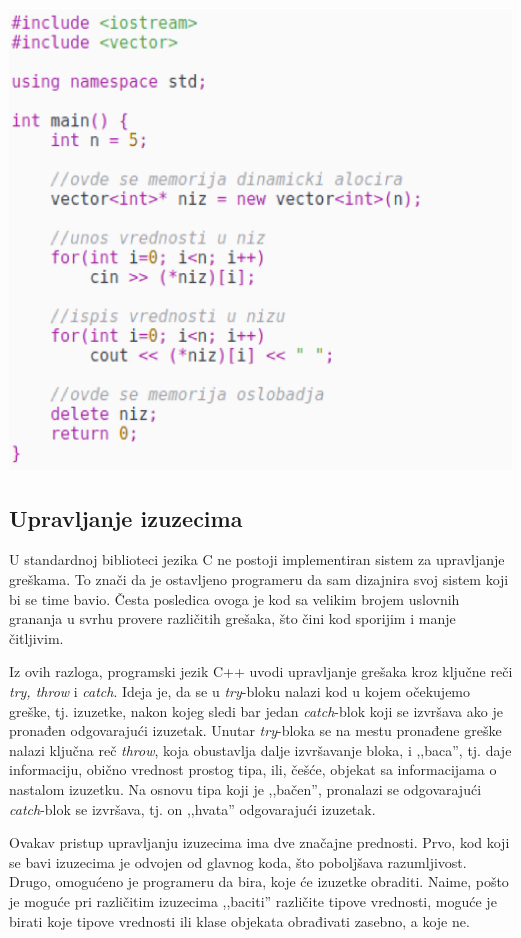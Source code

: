 \documentclass[a4paper]{article}
\begin{document}
{\includegraphics[scale=0.5]{cpp_kod_dinamicka_alokacija.eps}

\subsection{Upravljanje izuzecima}

U standardnoj biblioteci jezika C ne postoji implementiran sistem za upravljanje greškama. To znači da je ostavljeno programeru da sam dizajnira svoj sistem koji bi se time bavio. Česta posledica ovoga je kod sa velikim brojem uslovnih grananja u svrhu provere različitih grešaka, što čini kod sporijim i manje čitljivim.

Iz ovih razloga, programski jezik C++ uvodi upravljanje grešaka kroz ključne reči \emph{try, throw} i \emph{catch}. Ideja je, da se u \emph{try}-bloku nalazi kod u kojem očekujemo greške, tj. izuzetke, nakon kojeg sledi bar jedan \emph{catch}-blok koji se izvršava ako je pronađen odgovarajući izuzetak. Unutar \emph{try}-bloka se na mestu pronađene greške nalazi ključna reč \emph{throw}, koja obustavlja dalje izvršavanje bloka, i ,,baca'', tj. daje informaciju, obično vrednost prostog tipa, ili, češće, objekat sa informacijama o nastalom izuzetku. Na osnovu tipa koji je ,,bačen'', pronalazi se odgovarajući \emph{catch}-blok se izvršava, tj. on ,,hvata'' odgovarajući izuzetak.

Ovakav pristup upravljanju izuzecima ima dve značajne prednosti. Prvo, kod koji se bavi izuzecima je odvojen od glavnog koda, što poboljšava razumljivost. Drugo, omogućeno je programeru da bira, koje će izuzetke obraditi. Naime, pošto je moguće pri različitim izuzecima ,,baciti'' različite tipove vrednosti, moguće je birati koje tipove vrednosti ili klase objekata obrađivati zasebno, a koje ne.

}
\end{document}
